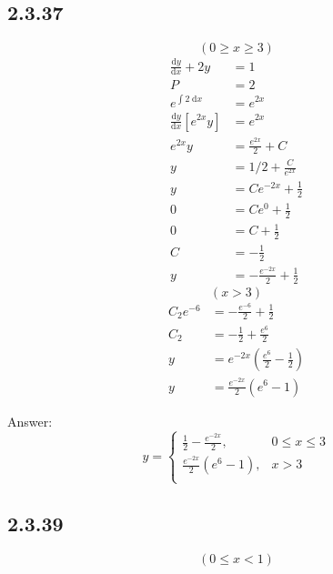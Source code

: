 \documentclass{article}
\begin{document}
\newpage
\subsection{2.3.37}
\[
    (0 \ge x \ge 3)
\]
\begin{align*}
    \frac{\mathrm{d}y}{\mathrm{d}x}+2y &= 1\\
    P &= 2\\
    e^{\int 2 \; \mathrm{d}x} &= e^{2x}\\
    \frac{\mathrm{d}y}{\mathrm{d}x}[e^{2x}y] &= e^{2x}\\
    e^{2x}y &= \frac{e^{2x}}{2}+C\\
    y &= 1/2+\frac{C}{e^{2x}}\\
    y &= Ce^{-2x}+\frac{1}{2}\\ 
    0 &= Ce^{0}+\frac{1}{2}\\
    0 &= C+\frac{1}{2}\\
    C &= -\frac{1}{2}\\
    y &= -\frac{e^{-2x}}{2}+\frac{1}{2}
\end{align*}
\[
    (x > 3)
\]
\begin{align*}
    C_2e^{-6} &= -\frac{e^{-6}}{2}+\frac{1}{2}\\
    C_2 &= -\frac{1}{2}+\frac{e^{6}}{2}\\
    y &= e^{-2x}(\frac{e^{6}}{2}-\frac{1}{2})\\
    y &= \frac{e^{-2x}}{2}\left(e^{6}-1\right)
\end{align*}

Answer:
\[
    y= \begin{cases} \frac{1}{2}-\frac{e^{-2x}}{2}, & 0 \le x \le 3 \\ \frac{e^{-2x}}{2}\left(e^{6}-1\right), & x > 3  \\ \end{cases}
\]


\newpage
\subsection{2.3.39}
\[
    (0 \le x < 1)
\]
    
\end{document}
